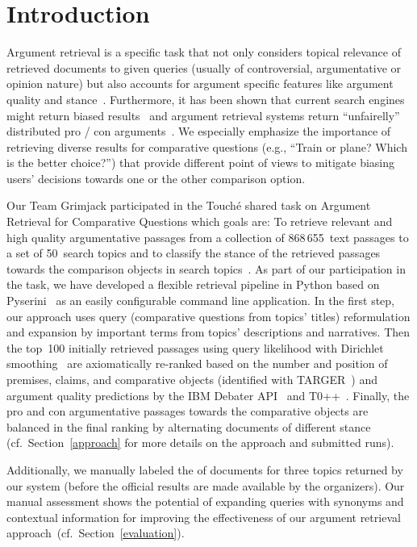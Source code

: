 \section{Introduction}\label{intro}

Argument retrieval is a specific task that not only considers topical relevance of retrieved documents to given queries (usually of controversial, argumentative or opinion nature) but also accounts for argument specific features like argument quality and stance~\cite{BondarenkoFBGAPBSWPH2020, BondarenkoGFBAPBSWPH2021}.  
Furthermore, it has been shown that current search engines might return biased results~\cite{ShahB2022} and argument retrieval systems return ``unfairelly'' distributed pro / con arguments~\cite{CherumanalSSC2021}.
We especially emphasize the importance of retrieving diverse results for comparative questions (e.g., ``Train or plane? Which is the better choice?'') that provide different point of views to mitigate biasing users' decisions towards one or the other comparison option.

Our Team Grimjack participated in the Touch{\'e} shared task on Argument Retrieval for Comparative Questions which goals are: \Ni To retrieve relevant and high quality argumentative passages from a collection of 868\,655~text passages to a set of 50~search topics and \Nii to classify the stance of the retrieved passages towards the comparison objects in search topics~\cite{BondarenkoFKSGBPBSWPH2022}.
As part of our participation in the task, we have developed a flexible retrieval pipeline in Python based on Pyserini~\cite{LinMLYPN2021} as an easily configurable command line application.
In the first step, our approach uses query (comparative questions from topics' titles) reformulation and expansion by important terms from topics' descriptions and narratives. Then the top~100 initially retrieved passages using query likelihood with Dirichlet smoothing~\cite{ZhaiL2001} are axiomatically re-ranked based on the number and position of premises, claims, and comparative objects (identified with TARGER~\cite{ChernodubOHBHBP2019}) and argument quality predictions by the IBM Debater API~\cite{ToledoGCFVLJAS2019} and T0++~\cite{SanhWRBSACSLRDBXTSSKCNDCJWMSYPBWNRSSFFTBGBWR2021}.
Finally, the pro and con argumentative passages towards the comparative objects are balanced in the final ranking by alternating documents of different stance (cf.\ Section~\ref{approach} for more details on the approach and submitted runs).

Additionally, we manually labeled the  of  documents for three topics returned by our system (before the official results are made available by the organizers). Our manual assessment shows the potential of expanding queries with synonyms and contextual information for improving the effectiveness of our argument retrieval approach~(cf.\ Section~\ref{evaluation}).

